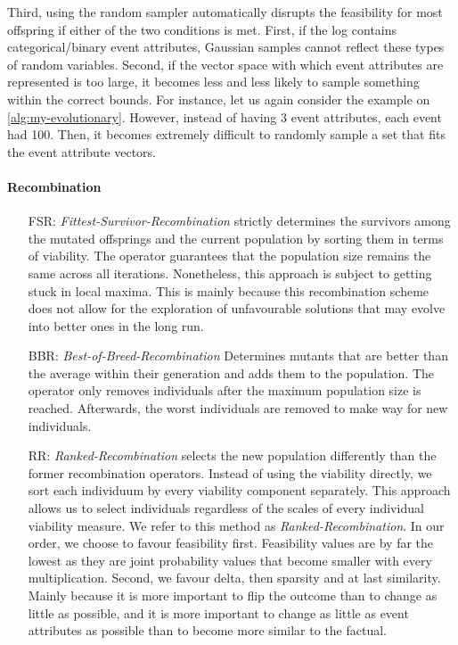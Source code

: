 \documentclass[./../../paper.tex]{subfiles}
\begin{document}
Third, using the random sampler automatically disrupts the feasibility for most offspring if either of the two conditions is met. First, if the log contains categorical/binary event attributes, Gaussian samples cannot reflect these types of random variables. Second, if the vector space with which event attributes are represented is too large, it becomes less and less likely to sample something within the correct bounds.
For instance, let us again consider the example on \autoref{alg:my-evolutionary}.
However, instead of having 3 event attributes, each event had 100. Then, it becomes extremely difficult to randomly sample a set that fits the event attribute vectors.

\paragraph{Recombination}
\begin{enumerate}
    \item[FSR:] \emph{Fittest-Survivor-Recombination} strictly determines the survivors among the mutated offsprings and the current population by sorting them in terms of viability.
    The operator guarantees that the population size remains the same across all iterations.
    Nonetheless, this approach is subject to getting stuck in local maxima. This is mainly because this recombination scheme does not allow for the exploration of unfavourable solutions that may evolve into better ones in the long run.
    \item[BBR:] \emph{Best-of-Breed-Recombination} Determines mutants that are better than the average within their generation and adds them to the population. The operator only removes individuals after the maximum population size is reached. Afterwards, the worst individuals are removed to make way for new individuals.
    \item[RR:] \emph{Ranked-Recombination} selects the new population differently than the former recombination operators. Instead of using the viability directly, we sort each individuum by every viability component separately. This approach allows us to select individuals regardless of the scales of every individual viability measure. We refer to this method as \emph{Ranked-Recombination}. In our order, we choose to favour feasibility first. Feasibility values are by far the lowest as they are joint probability values that become smaller with every multiplication. Second, we favour delta, then sparsity and at last similarity. Mainly because it is more important to flip the outcome than to change as little as possible, and it is more important to change as little as event attributes as possible than to become more similar to the factual.
\end{enumerate}
\end{document}
